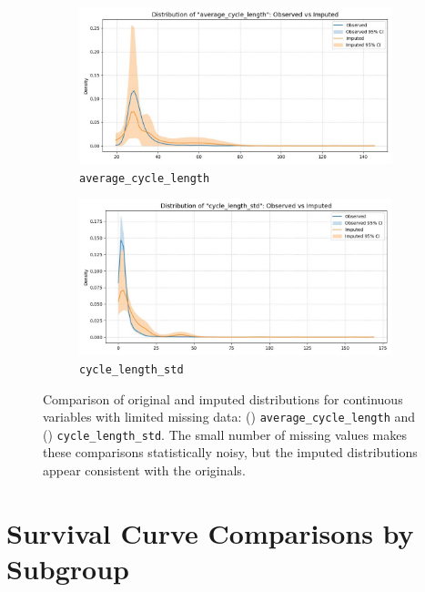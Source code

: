 \documentclass[11pt]{article}
\begin{document}
\begin{figure}[h]
  \centering
  \begin{subfigure}{0.45\textwidth}
    \includegraphics[width=\linewidth]{plots/mf_average_cycle_length.jpg}
    \caption{\texttt{average\_cycle\_length}}
    \label{fig:mf_avg_cycle}
  \end{subfigure}
  \hfill
  \begin{subfigure}{0.45\textwidth}
    \includegraphics[width=\linewidth]{plots/mf_cycle_length_std.jpg}
    \caption{\texttt{cycle\_length\_std}}
    \label{fig:mf_cycle_std}
  \end{subfigure}
  \caption{
    Comparison of original and imputed distributions for continuous variables with limited missing data: 
    () \texttt{average\_cycle\_length} and 
    () \texttt{cycle\_length\_std}. 
    The small number of missing values makes these comparisons statistically noisy, but the imputed distributions appear consistent with the originals.
  }
  \label{fig:mf_continuous}
\end{figure}

\clearpage

\section{Survival Curve Comparisons by Subgroup}
\label{app:survival_subgroups}
\end{document}
